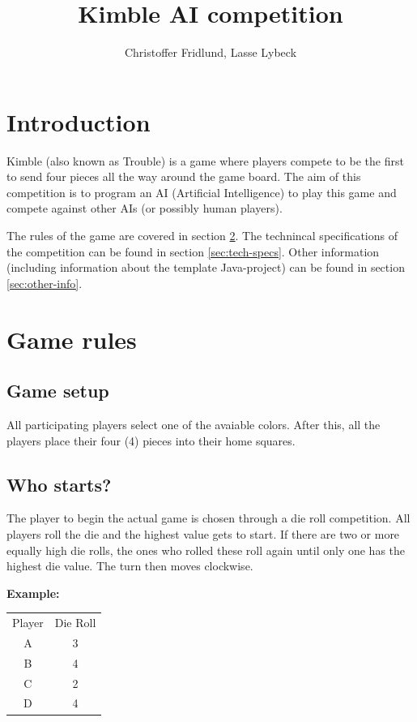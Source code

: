 \documentclass[10pt,a4paper]{article}
\author{Christoffer Fridlund, Lasse Lybeck}
\title{Kimble AI competition}
\begin{document}
\maketitle

\tableofcontents


\section{Introduction}

Kimble (also known as Trouble) is a game where players compete to be the first to send four pieces all the way around the game board. The aim of this competition is to program an AI (Artificial Intelligence) to play this game and compete against other AIs (or possibly human players).

The rules of the game are covered in section \ref{sec:rules}. The technincal specifications of the competition can be found in section \ref{sec:tech-specs}. Other information (including information about the template Java-project) can be found in section \ref{sec:other-info}.


\section{Game rules}
\label{sec:rules}

\subsection{Game setup}

All participating players select one of the avaiable colors. After this, all the players place their four (4) pieces into their home squares.

\subsection{Who starts?}

The player to begin the actual game is chosen through a die roll competition. All players roll the die and the highest value gets to start. If there are two or more equally high die rolls, the ones who rolled these roll again until only one has the highest die value. The turn then moves clockwise.

\textbf{Example:}

\begin{tabular}{c c}
	Player & Die Roll \\
	A & 3 \\
	B & 4 \\
	C & 2 \\
	D & 4
\end{tabular}
\end{document}
